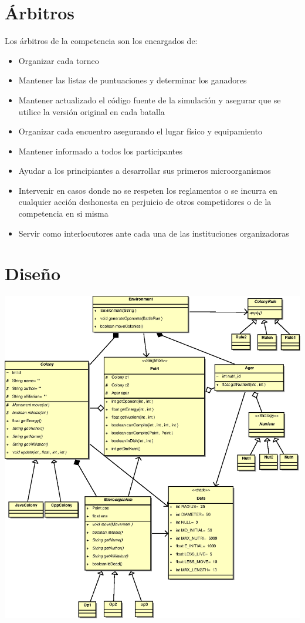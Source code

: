\documentclass[11pt,a4paper]{article}
\begin{document}
\section{Árbitros}
Los árbitros de la competencia son los encargados de:
\begin{itemize}
\item Organizar cada torneo
\item Mantener las listas de puntuaciones y determinar los ganadores
\item Mantener actualizado el código fuente de la simulación y asegurar que se utilice la versión original en cada batalla
\item Organizar cada encuentro asegurando el lugar físico y equipamiento
\item Mantener informado a todos los participantes
\item Ayudar a los principiantes a desarrollar sus primeros microorganismos
\item Intervenir en casos donde no se respeten los reglamentos o se incurra en cualquier acción deshonesta en perjuicio de otros competidores o de la competencia en si misma
\item Servir como interlocutores ante cada una de las instituciones organizadoras
\end{itemize}

\section{Diseño}
\includegraphics[scale=0.8]{modelo}
\end{document}
